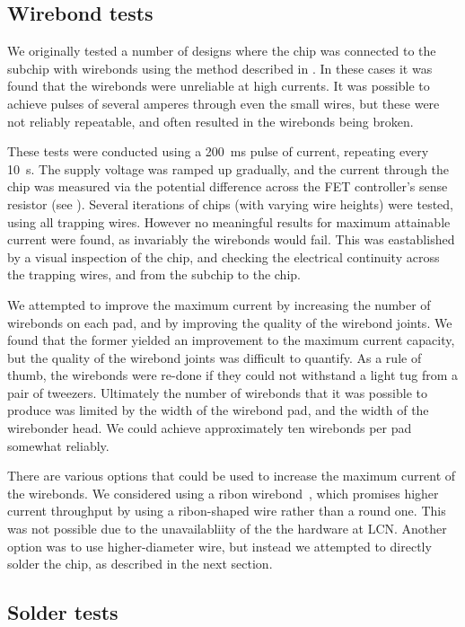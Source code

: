 \subsection{Wirebond tests}

We originally tested a number of designs where the chip was connected to the
subchip with wirebonds using the method described in . In these cases it was found that the wirebonds were unreliable at
high currents. It was possible to achieve pulses of several amperes through
even the small wires, but these were not reliably repeatable, and often
resulted in the wirebonds being broken.

These tests were conducted using a \SI{200}{\milli\second} pulse of current,
repeating every \SI{10}{\second}. The supply voltage was ramped up gradually,
and the current through the chip was measured via the potential difference
across the FET controller's sense resistor (see ).
Several iterations of chips (with varying wire heights) were tested, using all
trapping wires. However no meaningful results for maximum attainable current
were found, as invariably the wirebonds would fail. This was eastablished by a
visual inspection of the chip, and checking the electrical continuity across
the trapping wires, and from the subchip to the chip.

We attempted to improve the maximum current by increasing the number of
wirebonds on each pad, and by improving the quality of the wirebond joints. We
found that the former yielded an improvement to the maximum current capacity,
but the quality of the wirebond joints was difficult to quantify. As a rule of
thumb, the wirebonds were re-done if they could not withstand a light tug from
a pair of tweezers. Ultimately the number of wirebonds that it was possible to
produce was limited by the width of the wirebond pad, and the width of the
wirebonder head. We could achieve approximately ten wirebonds per pad somewhat
reliably.

There are various options that could be used to increase the maximum current of
the wirebonds.  We considered using a ribon wirebond~\cite{}, which promises
higher current throughput by using a ribon-shaped wire rather than a round one.
This was not possible due to the unavailabliity of the the hardware at LCN.
Another option was to use higher-diameter wire, but instead we attempted to
directly solder the chip, as described in the next section.

\subsection{Solder tests}

